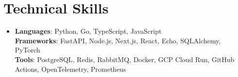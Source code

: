 \documentclass[letterpaper,11pt]{article}
\begin{document}
\section{Technical Skills}
\begin{itemize}[leftmargin=0.15in, label={}, topsep=0pt, itemsep=0pt, parsep=0pt, partopsep=0pt]
  \item{\fontsize{9.6pt}{10.0pt}\selectfont
   \textbf{Languages}{: Python, Go, TypeScript, JavaScript} \\
   \textbf{Frameworks}{: FastAPI, Node.js, Next.js, React, Echo, SQLAlchemy, PyTorch} \\
   \textbf{Tools}{: PostgreSQL, Redis, RabbitMQ, Docker, GCP Cloud Run, GitHub Actions, OpenTelemetry, Prometheus} \\
  }
\end{itemize}
\end{document}
